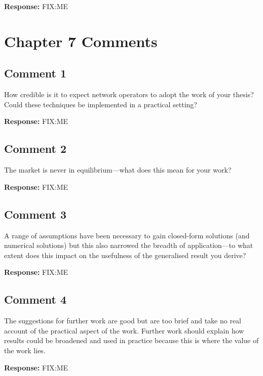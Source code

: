 \documentclass[10pt,a4paper,notitlepage]{article}
\numberwithin{equation}{section}
\begin{document}
\textbf{Response:}
FIX:ME

\clearpage

\section{Chapter 7 Comments}
\subsection{Comment 1}
How credible is it to expect network operators to adopt the work of your thesis? Could these techniques be implemented in a practical setting?

\textbf{Response:}
FIX:ME

\subsection{Comment 2}
The market is never in equilibrium---what does this mean for your work?

\textbf{Response:}
FIX:ME

\subsection{Comment 3}
A range of assumptions have been necessary to gain closed-form solutions (and numerical solutions) but this also narrowed the breadth of application---to what extent does this impact on the usefulness of the generalised result you derive?

\textbf{Response:}
FIX:ME

\subsection{Comment 4}
The suggestions for further work are good but are too brief and take no real account of the practical aspect of the work. Further work should explain how results could be broadened and used in practice because this is where the value of the work lies.

\textbf{Response:}
FIX:ME
\end{document}
